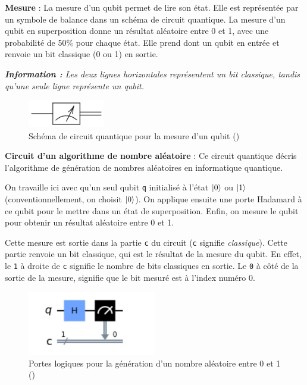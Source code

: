 \documentclass{article}
\begin{document}
\textbf{Mesure} :
La mesure d'un qubit permet de lire son état. Elle est représentée par un symbole de balance dans
un schéma de circuit quantique. La mesure d'un qubit en superposition donne un résultat aléatoire
entre 0 et 1, avec une probabilité de 50\% pour chaque état. Elle prend dont un qubit en entrée et
renvoie un bit classique (0 ou 1) en sortie.

\textit{\textbf{Information :} Les deux lignes horizontales représentent un bit classique, tandis qu'une seule ligne représente un qubit.}

\begin{figure}[H]
  \centering
  \includegraphics[width=0.3\textwidth]{img/mesure.png}
  \caption{Schéma de circuit quantique pour la mesure d'un qubit (\cite{wikipediaPorteQuantique})}
\end{figure}

\textbf{Circuit d'un algorithme de nombre aléatoire} :
Ce circuit quantique décris l'algorithme de génération de nombres aléatoires en informatique quantique. 

On travaille ici avec qu'un seul qubit \texttt{q} initialisé à l'état $\ket{0}$ ou $\ket{1}$ (conventionnellement, on choisit $\ket{0}$).
On applique ensuite une porte Hadamard à ce qubit pour le mettre dans un état de superposition. 
Enfin, on mesure le qubit pour obtenir un résultat aléatoire entre 0 et 1. 

Cette mesure est sortie dans la partie \texttt{c} du circuit (\texttt{c} signifie \textit{classique}).
Cette partie renvoie un bit classique, qui est le résultat de la mesure du qubit. En effet,
le \texttt{1} à droite de \texttt{c} signifie le nombre de bits classiques en sortie. Le \texttt{0}
à côté de la sortie de la mesure, signifie que le bit mesuré est à l'index numéro 0.


\begin{figure}[H]
  \centering
  \includegraphics[width=0.5\textwidth]{img/portesLogiquesRandom.png}
  \caption{Portes logiques pour la génération d'un nombre aléatoire entre 0 et 1 (\cite{sapTrueRandomness})}
\end{figure}
\end{document}
